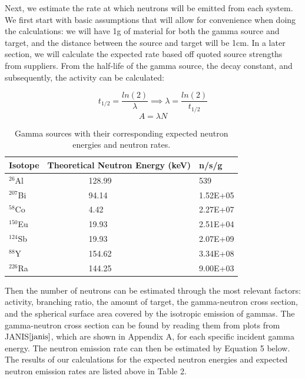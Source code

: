\documentclass[%
12pt,
twoside,
reprint,
amsmath,amssymb,
aps,
]{article}
\begin{document}
	\par Next, we estimate the rate at which neutrons will be emitted from each system. We first start with basic assumptions that will allow for convenience when doing the calculations: we will have 1g of material for both the gamma source and target, and the distance between the source and target will be 1cm. In a later section, we will calculate the expected rate based off quoted source strengths from suppliers. From the half-life of the gamma source, the decay constant, and subsequently, the activity can be calculated:
	
	\begin{equation*}
	t_{1/2} = \frac{ln(2)}{\lambda} \implies \lambda = \frac{ln(2)}{t_{1/2}}
	\end{equation*}
	\begin{equation*}
	A = \lambda N
	\end{equation*}
	
	\begin{table}
		\begin{center}
			\scriptsize
			\begin{tabular}{p{3.1cm} p{3.1cm} p{3.1cm}}
				\hline
				\textbf{Isotope} & \textbf{Theoretical Neutron Energy (keV)} & \textbf{n/s/g} \\ \hline
				$^{26}$Al &\ \ \ \ \ \ \ \ \ \ 128.99 & 539 \\ \hline
				$^{207}$Bi &\ \ \ \ \ \ \ \ \ \ 94.14 & 1.52E+05 \\ \hline
				$^{58}$Co &\ \ \ \ \ \ \ \ \ \ 4.42 & 2.27E+07 \\ \hline
				$^{150}$Eu &\ \ \ \ \ \ \ \ \ \ 19.93 & 2.51E+04 \\ \hline
				$^{124}$Sb &\ \ \ \ \ \ \ \ \ \ 19.93 & 2.07E+09 \\ \hline
				$^{88}$Y &\ \ \ \ \ \ \ \ \ \ 154.62 & 3.34E+08 \\ \hline
				$^{226}$Ra &\ \ \ \ \ \ \ \ \ \ 144.25 & 9.00E+03 \\ \hline
			\end{tabular}
			\caption{Gamma sources with their corresponding expected neutron energies and neutron rates.}
		\end{center}
	\end{table}
	
	\noindent Then the number of neutrons can be estimated through the most relevant factors: activity, branching ratio, the amount of target, the gamma-neutron cross section, and the spherical surface area covered by the isotropic emission of gammas. The gamma-neutron cross section can be found by reading them from plots from JANIS$\cite{janis}$, which are shown in Appendix A, for each specific incident gamma energy. The neutron emission rate can then be estimated by Equation 5 below. The results of our calculations for the expected neutron energies and expected neutron emission rates are listed above in Table 2.
	
\end{document}
